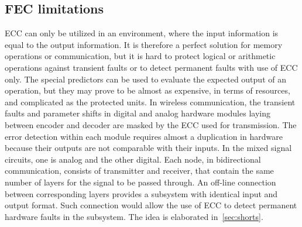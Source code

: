 \subsection{FEC limitations}
ECC can only be utilized in an environment, where the input information is equal to the output information. It is therefore a perfect solution for memory operations or communication, but it is hard to protect logical or arithmetic operations against transient faults or to detect permanent faults with use of ECC only. The special predictors can be used to evaluate the expected output of an operation, but they may prove to be almost as expensive, in terms of resources, and complicated as the protected units. In wireless communication, the transient faults and parameter shifts in digital and analog hardware modules laying between encoder and decoder are masked by the ECC used for transmission. The error detection within each module requires almost a duplication in hardware because their outputs are not comparable with their inputs. In the mixed signal circuits, one is analog and the other digital. Each node, in bidirectional communication, consists of transmitter and receiver, that contain the same number of layers for the signal to be passed through. An off-line connection between corresponding layers provides a subsystem with identical input and output format. Such connection would allow the use of ECC to detect permanent hardware faults in the subsystem. The idea is elaborated in~\autoref{sec:shorts}.

